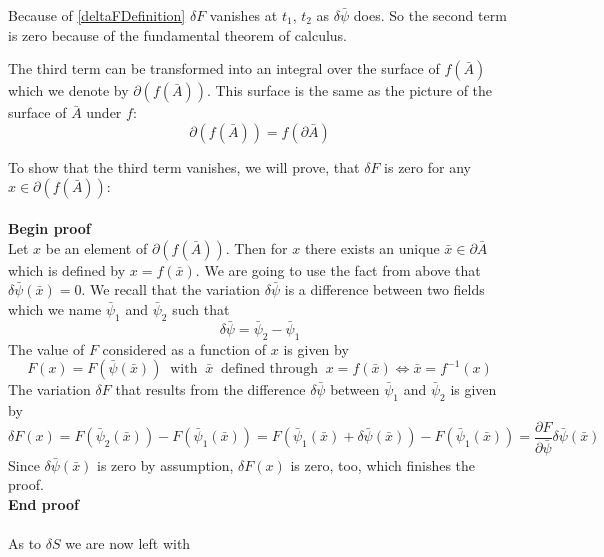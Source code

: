 \documentclass{article}
\begin{document}
Because of \ref{deltaFDefinition}
$\delta F$ vanishes at $t_1$, $t_2$ as $\delta \bar{\psi}$ does. So the second term is zero because of the fundamental theorem of calculus.

The third term can be transformed into an integral over the surface of $f(\bar{A})$ which we denote by $\partial (f(\bar{A}))$. This surface is the same as the picture of the surface of $\bar{A}$ under $f$: 
\begin{equation}
\partial (f(\bar{A})) = f(\partial \bar{A})
\end{equation}

To show that the third term vanishes, we will prove, that $\delta F$ is zero for any $x \in \partial (f(\bar{A}))$:
\\ 
\\

\noindent \textbf{Begin proof}
\\
Let $x$ be an element of $\partial (f(\bar{A}))$. Then for $x$ there exists an unique $\bar{x} \in \partial \bar{A}$ which is defined by $x=f(\bar{x})$. We are going to use the fact from above that $\delta \bar{\psi}(\bar{x}) = 0$. 
We recall that the variation $\delta \bar{\psi}$ is a difference between two fields which we name $\bar{\psi}_1$ and $\bar{\psi}_2$ such that
\begin{equation}
\delta \bar{\psi} = \bar{\psi}_2 - \bar{\psi}_1
\end{equation}
The value of $F$ considered as a function of $x$ is given by 
\begin{equation}
F(x) = F(\bar{\psi}(\bar{x})) \;\; \text{with} \;\; \bar{x} \;\; \text{defined through} \;\; x=f(\bar{x}) 
\iff \bar{x} = f^{-1}(x)
\end{equation}
The variation $\delta F$ that results from the difference $\delta \bar{\psi}$ between $\bar{\psi}_1$ and $\bar{\psi}_2$ is given by
\begin{equation}
\delta F(x) = F(\bar{\psi}_2(\bar{x})) - F(\bar{\psi}_1(\bar{x})) 
= F(\bar{\psi}_1(\bar{x}) + \delta \bar{\psi} (\bar{x})) - F(\bar{\psi}_1(\bar{x})) 
= \frac{\partial F}{\partial \bar{\psi}} \delta \bar{\psi} (\bar{x})
\end{equation}
Since $\delta \bar{\psi}(\bar{x})$ is zero by assumption, $\delta F(x)$ is zero, too, which finishes the proof.
\\
\textbf{End proof}
\\
\\

\noindent As to $\delta S$ we are now left with
\end{document}
